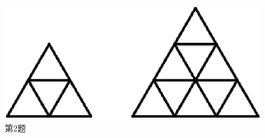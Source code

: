 \documentclass[10pt, a4paper]{article}
\begin{document}
\begin{enumerate}
        \begin{figure}[htbp]
            \centering
            \begin{minipage}[t]{.2\textwidth}
                \centering
                \includegraphics[width=1\textwidth]{2.png}
                \caption*{第2题}
            \end{minipage}
            \begin{minipage}[t]{.35\textwidth}
                \centering
                \begin{minipage}[t]{.18\textwidth}
                    \centering

\end{minipage}
\end{minipage}
\end{figure}
\end{enumerate}
\end{document}
